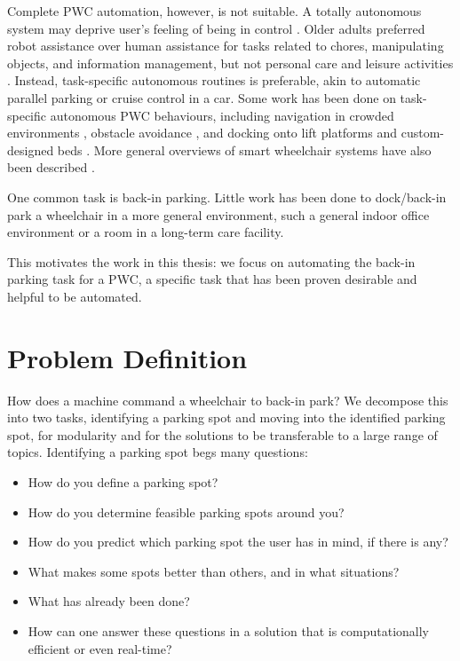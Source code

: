 Complete PWC automation, however, is not suitable. 
A totally autonomous system may deprive user's feeling of being in control 
\cite{viswanathana2014wizard}.
Older adults preferred robot assistance over human assistance for tasks related
to chores, manipulating objects, and information management, but not personal
care and leisure activities \cite{smarr2014domestic}.
Instead, task-specific autonomous routines is preferable, akin to automatic
parallel parking or cruise control in a car.
Some work has been done on task-specific autonomous PWC behaviours, including
navigation in crowded environments \cite{prassler2001robotics}, obstacle
avoidance \cite{viswanathan2012navigation}, and docking onto lift platforms
\cite{sermeno2006vision} and custom-designed beds \cite{ren2012docking}.
More general overviews of smart wheelchair systems have also been described
\cite{viswanathan2012navigation, simpson2005smart, faria2013patient}. 

One common task is back-in parking.
Little work has been done to dock/back-in park a wheelchair in a more general
environment, such a general indoor office environment or a room in a
long-term care facility. 

This motivates the work in this thesis: we focus on automating the back-in
parking task for a PWC, a specific task that has been proven desirable and
helpful to be automated.

\section{Problem Definition}
How does a machine command a wheelchair to back-in park? We decompose this into two
tasks, identifying a parking spot and moving into the identified parking spot,
for modularity and for the solutions to be transferable to a large range of
topics.
Identifying a parking spot begs many questions:
\begin{itemize}
\item How do you define a parking spot?
\item How do you determine feasible parking spots around you?
\item How do you predict which parking spot the user has in mind, if there is any?
\item What makes some spots better than others, and in what situations?
\item What has already been done?
\item How can one answer these questions in a solution that is 
computationally efficient or even real-time?
\end{itemize}

